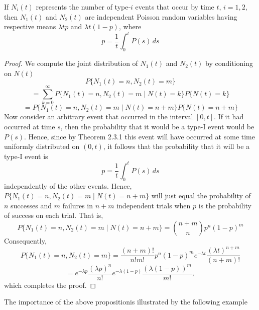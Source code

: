 \documentclass[lang=cn,10pt,thmcnt=section]{elegantbook}
\begin{document}
\begin{proposition}
	If \( N_i(t) \) represents the number of type-\( i \) events that occur by time \( t \), \( i = 1, 2 \), then \( N_1(t) \) and \( N_2(t) \) are independent Poisson random variables having respective means \( \lambda t p \) and \( \lambda t(1 - p) \), where
\[
p = \frac{1}{t} \int_0^t P(s) \, ds
\]
\end{proposition}
\begin{proof}
	We compute the joint distribution of \( N_1(t) \) and \( N_2(t) \) by conditioning on \( N(t) \)
\[
P\{N_1(t) = n, N_2(t) = m\}
\]
\[
= \sum_{k=0}^{\infty} P\{N_1(t) = n, N_2(t) = m \mid N(t) = k\} P\{N(t) = k\}
\]
\[
= P\{N_1(t) = n, N_2(t) = m \mid N(t) = n + m\} P\{N(t) = n + m\}
\]
Now consider an arbitrary event that occurred in the interval \([0, t]\). If it had occurred at time \( s \), then the probability that it would be a type-I event would be \( P(s) \). Hence, since by Theorem 2.3.1 this event will have occurred at some time uniformly distributed on \((0, t)\), it follows that the probability that it will be a type-I event is
\[
p = \frac{1}{t} \int_0^t P(s) \, ds
\]
independently of the other events. Hence, \( P\{N_1(t) = n, N_2(t) = m \mid N(t) = n + m\} \) will just equal the probability of \( n \) successes and \( m \) failures in \( n + m \) independent trials when \( p \) is the probability of success on each trial. That is,
\[
P\{N_1(t) = n, N_2(t) = m \mid N(t) = n + m\} = \binom{n + m}{n} p^n (1 - p)^m
\]
Consequently,
\[
P\{N_1(t) = n, N_2(t) = m\} = \frac{(n + m)!}{n! m!} p^n (1 - p)^m e^{-\lambda t} \frac{(\lambda t)^{n + m}}{(n + m)!}
\]
\[
= e^{-\lambda p} \frac{(\lambda p)^n}{n!} e^{-\lambda (1 - p)} \frac{(\lambda (1 - p))^m}{m!},
\]
which completes the proof.
\end{proof}
The importance of the above propositionis illustrated by the following example
\end{document}
